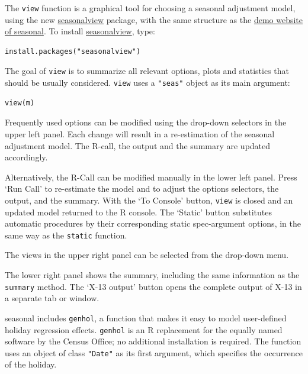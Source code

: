 The \texttt{view} function is a graphical tool for choosing a seasonal
adjustment model, using the new
\href{https://cran.r-project.org/package=seasonalview}{seasonalview}
package, with the same structure as the
\href{http://www.seasonal.website}{demo website of seasonal}. To install
\href{https://cran.r-project.org/package=seasonalview}{seasonalview},
type:

\begin{verbatim}
install.packages("seasonalview")
\end{verbatim}

The goal of \texttt{view} is to summarize all relevant options, plots
and statistics that should be usually considered. \texttt{view} uses a
\texttt{"seas"} object as its main argument:

\begin{verbatim}
view(m)
\end{verbatim}

Frequently used options can be modified using the drop-down selectors in
the upper left panel. Each change will result in a re-estimation of the
seasonal adjustment model. The R-call, the output and the summary are
updated accordingly.

Alternatively, the R-Call can be modified manually in the lower left
panel. Press `Run Call' to re-estimate the model and to adjust the
options selectors, the output, and the summary. With the `To Console'
button, \texttt{view} is closed and an updated model returned to the R
console. The `Static' button substitutes automatic procedures by their
corresponding static spec-argument options, in the same way as the
\texttt{static} function.

The views in the upper right panel can be selected from the drop-down
menu.

The lower right panel shows the summary, including the same information
as the \texttt{summary} method. The `X-13 output' button opens the
complete output of X-13 in a separate tab or window.


seasonal includes \texttt{genhol}, a function that makes it easy to
model user-defined holiday regression effects. \texttt{genhol} is an R
replacement for the equally named software by the Census Office; no
additional installation is required. The function uses an object of
class \texttt{"Date"} as its first argument, which specifies the
occurrence of the holiday.

